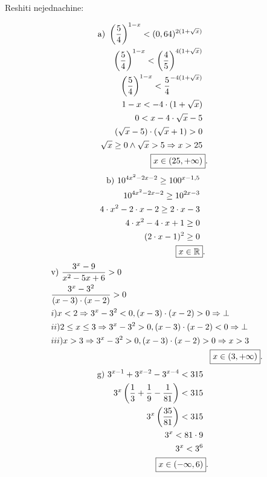 \documentclass[11pt]{article}
\begin{document}
\begin{zad} Reshiti nejednachine:\\[-5mm]
\begin{multicols}{2}
\noindent
\begin{align*}
\text{a) } \left( \frac{5}{4}\right)^{1-x}<(0,64)^{2(1+\sqrt x)}\\
\left( \frac{5}{4}\right)^{1-x}<\left(\frac{4}{5}\right)^{4(1+\sqrt x)}\\
\left( \frac{5}{4}\right)^{1-x}<\frac{5}{4}^{-4(1+\sqrt x)}\\
1-x<-4\cdot(1+\sqrt{x})\\
0<x-4\cdot\sqrt{x}-5\\
(\sqrt{x}-5)\cdot(\sqrt{x}+1)>0\\
\sqrt{x}\geq0 \land \sqrt{x}>5\Rightarrow x>25\\
\Aboxed{x\in(25,+\infty)}.
\end{align*}
\begin{align*}
\text{b) } 10^{4x^2-2x-2}\geq 100^{x-1,5}\\
10^{4x^2-2x-2}\geq 10^{2x-3}\\
4\cdot x^2-2\cdot x-2\geq 2\cdot x-3\\
4\cdot x^2-4\cdot x+1\geq0\\
(2\cdot x-1)^2\geq0\\
\Aboxed{x\in\mathbb{R}}.
\end{align*}
\begin{align*}
&\text{v) } \frac{3^x-9}{x^2-5x+6}>0\\
&\frac{3^x-3^2}{(x-3)\cdot(x-2)}>0\\
&i)x<2\Rightarrow 3^x-3^2<0, (x-3)\cdot(x-2)>0\Rightarrow\bot\\
&ii)2\leq x\leq3\Rightarrow 3^x-3^2>0, (x-3)\cdot(x-2)<0\Rightarrow\bot\\
&iii)x>3\Rightarrow 3^x-3^2>0, (x-3)\cdot(x-2)>0\Rightarrow x>3\\
&\Aboxed{x\in(3,+\infty)}.
\end{align*}
\begin{align*}
\text{g) } 3^{x-1}+3^{x-2}-3^{x-4}<315\\
3^x\left(\frac{1}{3}+\frac{1}{9}-\frac{1}{81}\right)<315\\
3^x\left(\frac{35}{81}\right)<315\\
3^x<81\cdot9\\
3^x<3^6\\
\Aboxed{x\in(-\infty,6)}.
\end{align*}
\begin{align*}

\end{align*}
\end{multicols}
\end{zad}
\end{document}
